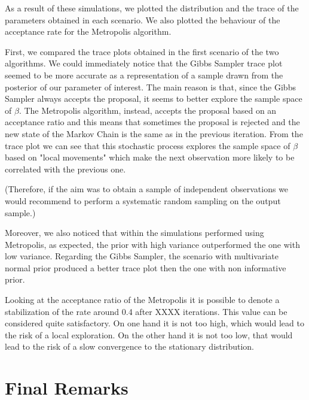 \documentclass{article}
\begin{document}
As a result of these simulations, we plotted the distribution and the trace of the parameters obtained in each scenario. We also plotted the behaviour of the acceptance rate for the Metropolis algorithm.  


First, we compared the trace plots obtained in the first scenario of the two algorithms. We could immediately notice that the Gibbs Sampler trace plot seemed to be more accurate as a representation of a sample drawn from the posterior of our parameter of interest. The main reason is that, since the Gibbs Sampler always accepts the proposal, it seems to better explore the sample space of \(\beta\). The Metropolis algorithm, instead, accepts the proposal based on an acceptance ratio and this means that sometimes the proposal is rejected and the new state of the Markov Chain is the same as in the previous iteration. From the trace plot we can see that this stochastic process explores the sample space of \(\beta\) based on "local movements" which make the next observation more likely to be correlated with the previous one. 

(Therefore, if the aim was to obtain a sample of independent observations we would recommend to perform a systematic random sampling on the output sample.) %

Moreover, we also noticed that within the simulations performed using Metropolis, as expected, the prior with high variance outperformed the one with low variance. Regarding the Gibbs Sampler, the scenario with multivariate normal prior produced a better trace plot then the one with non informative prior.     


Looking at the acceptance ratio of the Metropolis it is possible to denote a stabilization of the rate around 0.4 after XXXX iterations. This value can be considered quite satisfactory. On one hand it is not too high, which would lead to the risk of a local exploration. On the other hand it is not too low, that would lead to the risk of a slow convergence to the stationary distribution.


\section{Final Remarks}



\end{document}
